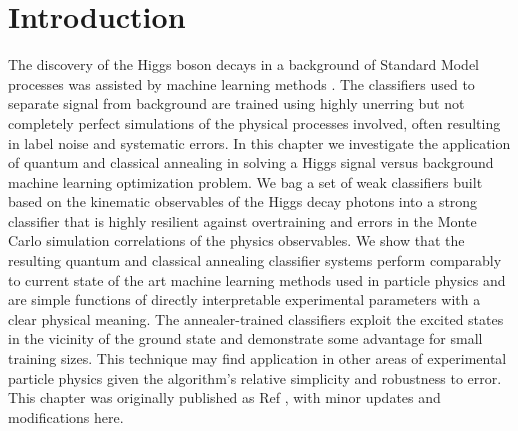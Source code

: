 

% 



\section{Introduction}
	The discovery of the Higgs boson decays in a background of Standard Model processes was assisted by machine learning methods \cite{Chatrchyan:2012xdj,Aad:2012tfa}. The classifiers used to separate signal from background are trained using  highly unerring but not completely perfect simulations of the physical processes involved, often resulting in label noise and systematic errors. In this chapter we investigate the application of quantum\cite{kadowaki_quantum_1998,RevModPhys.80.1061,Neven1,Pudenz:2013kx} and classical annealing\cite{kirkpatrick_optimization_1983,katzgraber:06a} in solving a Higgs signal versus background machine learning optimization problem.  We bag a set of weak classifiers built based on the kinematic observables of the Higgs decay photons into a strong classifier that is highly resilient against overtraining and errors in the Monte Carlo simulation correlations of the physics observables. We show that the resulting quantum and classical annealing classifier systems perform comparably to current state of the art machine learning methods used in particle physics\cite{keras,xgboost} and are simple functions of directly interpretable experimental parameters with a clear physical meaning. The annealer-trained classifiers exploit the excited states in the vicinity of the ground state and demonstrate some advantage for small training sizes. This  technique may find application in other areas of experimental particle physics given the algorithm's relative simplicity and robustness to error. This chapter was originally published as Ref \cite{myhiggs}, with minor updates and modifications here.

